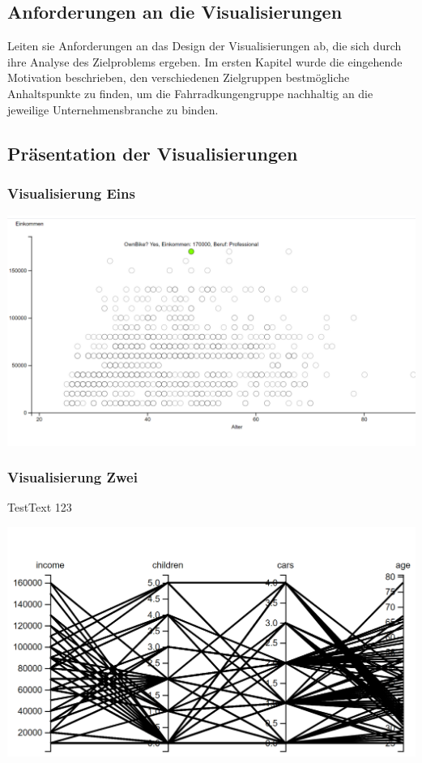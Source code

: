 \documentclass[usegeometry=true]{scrartcl}
\begin{document}
\subsection{Anforderungen an die Visualisierungen}
Leiten sie Anforderungen an das Design der Visualisierungen ab, die sich durch ihre Analyse des Zielproblems ergeben. Im ersten Kapitel wurde die eingehende Motivation beschrieben, den verschiedenen Zielgruppen bestmögliche Anhaltspunkte zu finden, um die Fahrradkungengruppe nachhaltig an die jeweilige Unternehmensbranche zu binden. 
\subsection{Präsentation der Visualisierungen}

\subsubsection{Visualisierung Eins}



\includegraphics{Scatterplot1}

\subsubsection{Visualisierung Zwei}

TestText 123

\includegraphics{parallelcoordinates}
\end{document}
